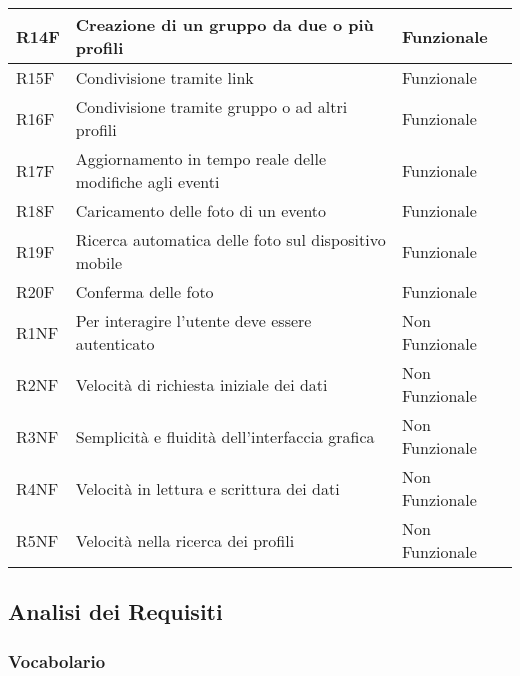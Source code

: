 \begin{tabular} {|P{1.5cm}|P{12.5cm}|P{3cm}|}
  \hline
  R14F        & Creazione di un gruppo da due o più profili                                 & Funzionale     \\
  \hline
  R15F        & Condivisione tramite link                                                   & Funzionale     \\
  \hline
  R16F        & Condivisione tramite gruppo o ad altri profili                              & Funzionale     \\
  \hline
  R17F        & Aggiornamento in tempo reale delle modifiche agli eventi                    & Funzionale     \\
  \hline
  R18F        & Caricamento delle foto di un evento                                         & Funzionale     \\
  \hline
  R19F        & Ricerca automatica delle foto sul dispositivo mobile                        & Funzionale     \\
  \hline
  R20F        & Conferma delle foto                                                         & Funzionale     \\
  \hline
  R1NF        & Per interagire l’utente deve essere autenticato                             & Non Funzionale \\
  \hline
  R2NF        & Velocità di richiesta iniziale dei dati                                     & Non Funzionale \\
  \hline
  R3NF        & Semplicità e fluidità dell'interfaccia grafica                              & Non Funzionale \\
  \hline
  R4NF        & Velocità in lettura e scrittura dei dati                                    & Non Funzionale \\
  \hline
  R5NF        & Velocità nella ricerca dei profili                                          & Non Funzionale \\
  \hline
\end{tabular}

\subsection{Analisi dei Requisiti}
\subsubsection{Vocabolario}

